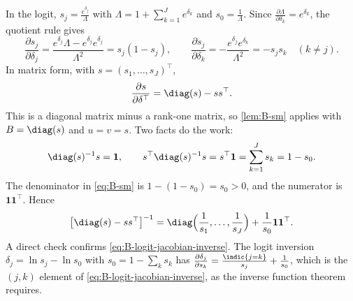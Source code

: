 \begin{example}\label{ex:B-logit-jacobian}
In the logit, $s_j = \frac{e^{\delta_j}}{\Lambda}$ with $\Lambda = 1 + \sum_{k = 1}^{J}e^{\delta_k}$ and $s_0 = \frac{1}{\Lambda}$. Since
$\frac{\partial \Lambda}{\partial \delta_k} = e^{\delta_k}$, the quotient rule gives
\begin{equation*}
\frac{\partial s_j}{\partial \delta_j} = \frac{e^{\delta_j}\Lambda - e^{\delta_j}e^{\delta_j}}{\Lambda^2} = s_j(1 - s_j) ,
\qquad
\frac{\partial s_j}{\partial \delta_k} = -\frac{e^{\delta_j}e^{\delta_k}}{\Lambda^2} = -s_js_k \quad (k \neq j) .
\end{equation*}
In matrix form, with $s = (s_1, \dots, s_J)^\top$,
\begin{equation}\label{eq:B-logit-jacobian}
\frac{\partial s}{\partial \delta^\top} = \diag(s) - ss^\top .
\end{equation}
This is a diagonal matrix minus a rank-one matrix, so \cref{lem:B-sm} applies with $B = \diag(s)$ and $u = v = s$.
Two facts do the work:
\begin{equation*}
\diag(s)^{-1}s = \mathbf{1} , \qquad s^\top\diag(s)^{-1}s = s^\top\mathbf{1} = \sum_{k = 1}^{J}s_k = 1 - s_0 .
\end{equation*}
The denominator in \eqref{eq:B-sm} is $1 - (1 - s_0) = s_0 > 0$, and the numerator is $\mathbf{1}\mathbf{1}^\top$. Hence
\begin{equation}\label{eq:B-logit-jacobian-inverse}
\big[\diag(s) - ss^\top\big]^{-1} = \diag\Big(\frac{1}{s_1}, \dots, \frac{1}{s_J}\Big) + \frac{1}{s_0}\mathbf{1}\mathbf{1}^\top .
\end{equation}
A direct check confirms \eqref{eq:B-logit-jacobian-inverse}. The logit inversion $\delta_j = \ln s_j - \ln s_0$ with
$s_0 = 1 - \sum_k s_k$ has $\frac{\partial \delta_j}{\partial s_k} = \frac{\indic\{j = k\}}{s_j} + \frac{1}{s_0}$, which is the
$(j, k)$ element of \eqref{eq:B-logit-jacobian-inverse}, as the inverse function theorem requires.


\end{example}
